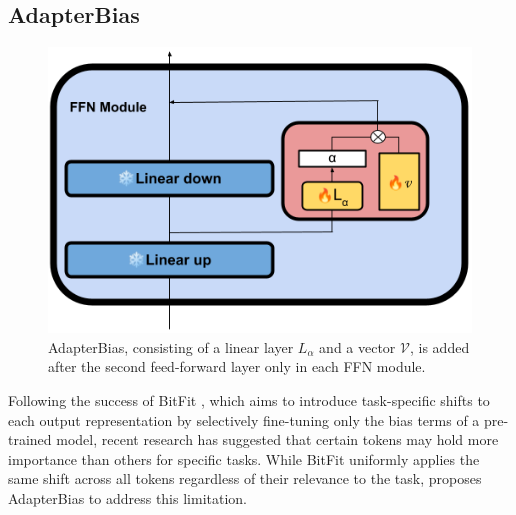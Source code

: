 

\subsection{AdapterBias}
\begin{figure}
    \begin{center}
        \includegraphics[scale=0.4]{imgs/AdapterBias.png}
        \caption{ AdapterBias, consisting of a linear layer $L_\alpha$ and a vector $\mathcal{V}$, is added after the second feed-forward layer only in each FFN module.}
        \label{fig:AdapterBias}
    \end{center}
\end{figure}
Following the success of BitFit \cite{ben-zaken-etal-2022-bitfit}, which aims to introduce task-specific shifts to each output representation by selectively fine-tuning only the bias terms of a pre-trained model, recent research has suggested that certain tokens may hold more importance than others for specific tasks. While BitFit uniformly applies the same shift across all tokens regardless of their relevance to the task, \cite{fu-etal-2022-adapterbias} proposes AdapterBias to address this limitation.

